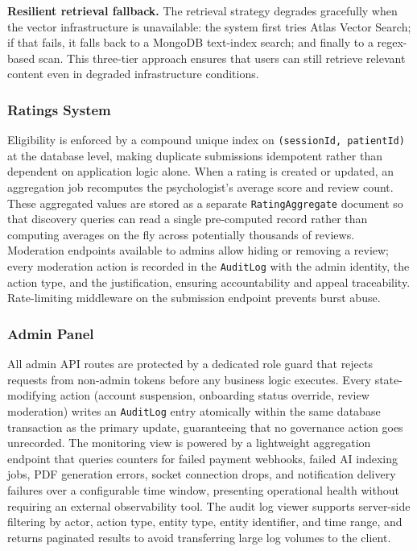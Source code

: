 \documentclass[a4paper,12pt]{report}
\begin{document}
\textbf{Resilient retrieval fallback.} The retrieval strategy degrades gracefully when the
vector infrastructure is unavailable: the system first tries Atlas Vector Search; if that
fails, it falls back to a MongoDB text-index search; and finally to a regex-based scan. This
three-tier approach ensures that users can still retrieve relevant content even in degraded
infrastructure conditions.
 
\subsubsection*{Ratings System}
 
Eligibility is enforced by a compound unique index on \texttt{(sessionId, patientId)} at the
database level, making duplicate submissions idempotent rather than dependent on application
logic alone. When a rating is created or updated, an aggregation job recomputes the
psychologist's average score and review count. These aggregated values are stored as a
separate \texttt{RatingAggregate} document so that discovery queries can read a single
pre-computed record rather than computing averages on the fly across potentially thousands of
reviews. Moderation endpoints available to admins allow hiding or removing a review; every
moderation action is recorded in the \texttt{AuditLog} with the admin identity, the action
type, and the justification, ensuring accountability and appeal traceability. Rate-limiting
middleware on the submission endpoint prevents burst abuse.
 
\subsubsection*{Admin Panel}
 
All admin API routes are protected by a dedicated role guard that rejects requests from
non-admin tokens before any business logic executes. Every state-modifying action (account
suspension, onboarding status override, review moderation) writes an \texttt{AuditLog} entry
atomically within the same database transaction as the primary update, guaranteeing that no
governance action goes unrecorded. The monitoring view is powered by a lightweight aggregation
endpoint that queries counters for failed payment webhooks, failed AI indexing jobs, PDF
generation errors, socket connection drops, and notification delivery failures over a
configurable time window, presenting operational health without requiring an external
observability tool. The audit log viewer supports server-side filtering by actor, action type,
entity type, entity identifier, and time range, and returns paginated results to avoid
transferring large log volumes to the client.
 
\end{document}
